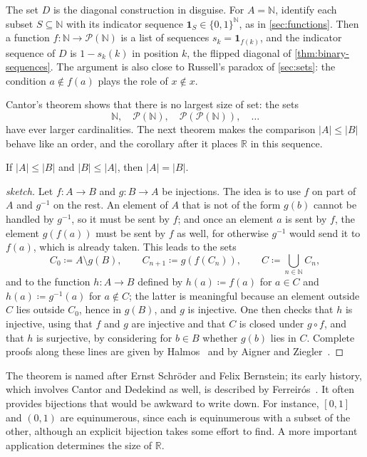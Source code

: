 The set $D$ is the diagonal construction in disguise. For $A=\mathbb N$, identify each subset $S\subseteq\mathbb N$ with its indicator sequence $\mathbf 1_S\in\{0,1\}^{\mathbb N}$, as in \cref{sec:functions}. Then a function $f\colon\mathbb N\to\mathcal P(\mathbb N)$ is a list of sequences $s_k=\mathbf 1_{f(k)}$, and the indicator sequence of $D$ is $1-s_k(k)$ in position $k$, the flipped diagonal of \cref{thm:binary-sequences}. The argument is also close to Russell's paradox of \cref{sec:sets}: the condition $a\notin f(a)$ plays the role of $x\notin x$.

Cantor's theorem shows that there is no largest size of set: the sets
\[
\mathbb N,\quad\mathcal P(\mathbb N),\quad\mathcal P(\mathcal P(\mathbb N)),\quad\ldots
\]
have ever larger cardinalities. The next theorem makes the comparison $|A|\le|B|$ behave like an order, and the corollary after it places $\mathbb R$ in this sequence.

\begin{theorem}
\label{thm:schroeder-bernstein}
If $|A|\le|B|$ and $|B|\le|A|$, then $|A|=|B|$.
\end{theorem}

\begin{proof}[sketch]
Let $f\colon A\to B$ and $g\colon B\to A$ be injections. The idea is to use $f$ on part of $A$ and $g^{-1}$ on the rest. An element of $A$ that is not of the form $g(b)$ cannot be handled by $g^{-1}$, so it must be sent by $f$; and once an element $a$ is sent by $f$, the element $g(f(a))$ must be sent by $f$ as well, for otherwise $g^{-1}$ would send it to $f(a)$, which is already taken. This leads to the sets
\[
C_0\coloneqq A\setminus g(B),\qquad C_{n+1}\coloneqq g(f(C_n)),\qquad C\coloneqq\bigcup_{n\in\mathbb N}C_n ,
\]
and to the function $h\colon A\to B$ defined by $h(a)\coloneqq f(a)$ for $a\in C$ and $h(a)\coloneqq g^{-1}(a)$ for $a\notin C$; the latter is meaningful because an element outside $C$ lies outside $C_0$, hence in $g(B)$, and $g$ is injective. One then checks that $h$ is injective, using that $f$ and $g$ are injective and that $C$ is closed under $g\circ f$, and that $h$ is surjective, by considering for $b\in B$ whether $g(b)$ lies in $C$. Complete proofs along these lines are given by Halmos~\cite{halmos1960naive} and by Aigner and Ziegler~\cite{aigner2018proofs}.
\end{proof}

The theorem is named after Ernst Schr\"oder and Felix Bernstein; its early history, which involves Cantor and Dedekind as well, is described by Ferreir\'os~\cite{ferreiros2007}. It often provides bijections that would be awkward to write down. For instance, $[0,1]$ and $(0,1)$ are equinumerous, since each is equinumerous with a subset of the other, although an explicit bijection takes some effort to find. A more important application determines the size of $\mathbb R$.

